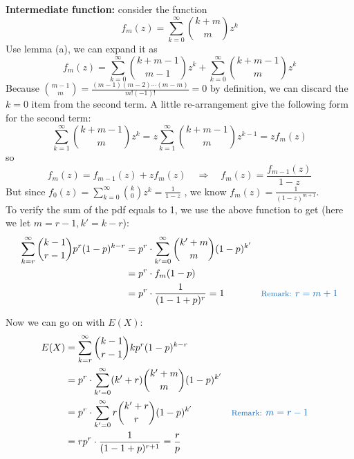 \documentclass[11pt]{article}
\begin{document}
\textbf{Intermediate function:} consider the function
\[
f_m(z) = \sum _{k=0} ^\infty \binom {k+m}{m} z^k
\]
Use lemma (a),  we can expand it as
\[
f_m(z) = \sum _{k=0} ^\infty \binom {k+m-1}{m-1} z^k + \sum _{k=0} ^\infty \binom {k+m-1}{m} z^k
\]
Because  $\displaystyle \binom {m-1}{m} = \frac{(m-1)(m-2) \cdots (m-m)}{m! (-1)!} = 0 $ by definition,  we can discard the $k=0$ item from the second term.  A little re-arrangement give the following form for the second term:
\[
\sum _{k=1} ^\infty \binom {k+m-1}{m} z^k = z \sum _{k=1} ^\infty \binom {k+m-1}{m} z^{k-1} = z f_m(z) 
\]
so
\[
f_m(z) = f_{m-1}(z) + z f_m(z) \quad \Rightarrow \quad f_m(z) = \frac{f_{m-1} (z)}{1-z}
\]
But since $\displaystyle f_0 (z) = \sum ^\infty _{k=0} \binom {k}{0} z^k = \frac{1}{1-z}$ ,  we know $\displaystyle f_m(z) = \frac{1}{(1-z)^{m+1} } $.\\


To verify the sum of the pdf equals to 1,  we use the above function to get (here we let $m=r-1,  k'=k-r$):
\begin{equation}
\begin{aligned}[t] 
\sum _{k=r} ^\infty \binom {k-1}{r-1} p^r (1-p)^{k-r} 
	&= p^r \cdot  \sum _{k'=0} ^\infty \binom {k' + m}{m}  (1-p)^{k'} \\
	&= p^r \cdot f_m (1-p) \\
	&= p^r \cdot \frac{1}{(1-1+p)^r} = 1 & \color{RoyalBlue} \text{\footnotesize Remark: } r=m+1 \\
\end{aligned}
\end{equation}



Now we can go on with $E(X)$:
\begin{equation}
\begin{aligned}[t]
E(X) 
	&= \sum _{k=r} ^\infty \binom {k-1}{r-1} k p^r (1-p)^{k-r} \\
	&= p^r \cdot  \sum _{k'=0} ^\infty (k'+r)  \binom {k' + m}{m}  (1-p)^{k'}   \\
	&=  p^r \cdot  \sum _{k'=0} ^\infty r  \binom {k' + r}{r}  (1-p)^{k'} && \color{RoyalBlue}  \text{\footnotesize Remark: } m=r-1\\
	&= r p^r \cdot \frac{1}{(1-1+p)^{r+1} } = \frac{r}{p}  \\
\end{aligned}
\end{equation}
\end{document}
